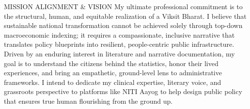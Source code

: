 \begin{rubric}{MISSION ALIGNMENT \& VISION}
\entry*[]
My ultimate professional commitment is to the structural, human, and equitable realization of a Viksit Bharat. I believe that sustainable national transformation cannot be achieved solely through top-down macroeconomic indexing; it requires a compassionate, inclusive narrative that translates policy blueprints into resilient, people-centric public infrastructure. Driven by an enduring interest in literature and narrative documentation, my goal is to understand the citizens behind the statistics, honor their lived experiences, and bring an empathetic, ground-level lens to administrative frameworks. I intend to dedicate my clinical expertise, literary voice, and grassroots perspective to platforms like NITI Aayog to help design public policy that ensures true human flourishing from the ground up.
\end{rubric}